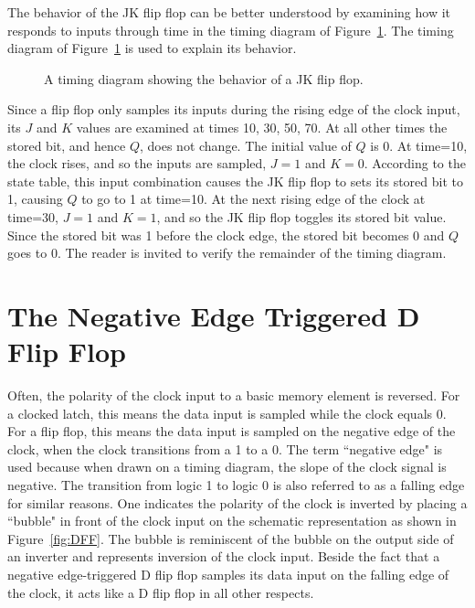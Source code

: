 The behavior of the JK flip flop can be better understood
by examining how it responds to inputs through time in the 
timing diagram of Figure~\ref{fig:JKFF}.  
The timing diagram of Figure~\ref{fig:JKFF}
is used to explain its behavior.
\begin{figure}[ht]
\caption{A timing diagram showing the behavior of a JK flip flop.}
\label{fig:JKFF}
\end{figure}

Since a flip flop only samples its inputs during the rising edge 
of the clock input, its $J$ and $K$ values are examined 
at times 10, 30, 50, 70. At all other times the stored bit, and 
hence $Q$, does not change. The initial value of $Q$ is 0.  At 
time=10, the clock rises, and so the inputs are sampled, $J=1$ and
$K=0$.  According to the state table, this input combination causes
the JK flip flop to sets its stored bit to 1, causing $Q$ to go
to 1 at time=10.  At the next rising edge of the clock at time=30, 
$J=1$ and $K=1$, and so the JK flip flop toggles its stored bit value.  
Since the stored bit was 1 before the clock edge, the stored bit
becomes 0 and $Q$ goes to 0.  The reader is invited to verify the
remainder of the timing diagram.

\section{The Negative Edge Triggered D Flip Flop}
Often, the polarity of the clock input to a 
basic memory element is reversed.  For a clocked latch, this
means the data input is sampled while the clock equals 0.
For a flip flop, this means the data input is sampled on
the negative edge of the clock, when the clock transitions 
from a 1 to a 0. The term ``negative edge" is used because when
drawn on a timing diagram, the slope of the clock signal is
negative.  The transition from logic 1 to logic 0 is also referred 
to as a falling edge for similar reasons.
One indicates the polarity 
of the clock is inverted by placing a ``bubble" in front of 
the clock input on the schematic representation as shown
in Figure~\ref{fig:DFF}.  The bubble is reminiscent 
of the bubble on the output side of an inverter and 
represents inversion of the clock input. Beside the fact 
that a negative edge-triggered D flip flop samples its 
data input on the falling edge of the clock, it acts like 
a D flip flop in all other respects.

